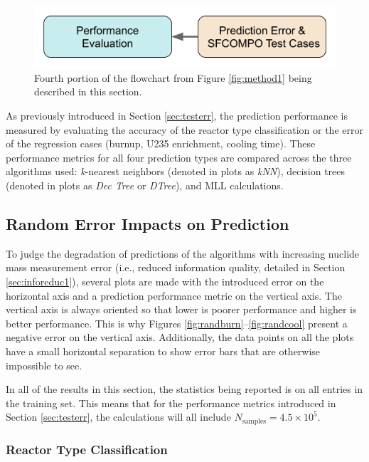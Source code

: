 
\begin{figure}[H]
  \centering
  \includegraphics[width=0.7\linewidth]{./chapters/exp1/methodology1_4.png}
  \caption[Fourth portion of the flowchart from Figure \ref{fig:method1}]
          {Fourth portion of the flowchart from Figure \ref{fig:method1} being 
           described in this section.}
\end{figure}

As previously introduced in Section \ref{sec:testerr}, the prediction
performance is measured by evaluating the accuracy of the reactor type
classification or the error of the regression cases (burnup, \gls{U235}
enrichment, cooling time).  These performance metrics for all four prediction
types are compared across the three algorithms used: \textit{k}-nearest
neighbors (denoted in plots as \textit{kNN}), decision trees (denoted in plots
as \textit{Dec Tree} or \textit{DTree}), and \gls{MLL} calculations.  

\subsection{Random Error Impacts on Prediction}
\label{sec:randerr}

To judge the degradation of predictions of the algorithms with increasing
nuclide mass measurement error (i.e., reduced information quality, detailed in
Section \ref{sec:inforeduc1}), several plots are made with the introduced error
on the horizontal axis and a prediction performance metric on the
vertical axis.  The vertical axis is always oriented so that lower is
poorer performance and higher is better performance. This is why Figures
\ref{fig:randburn}--\ref{fig:randcool} present a negative error on the
vertical axis. Additionally, the data points on all the plots have a small
horizontal separation to show error bars that are otherwise impossible to see.

In all of the results in this section, the statistics being reported is on all
entries in the training set. This means that for the performance metrics
introduced in Section \ref{sec:testerr}, the calculations will all include
$N_\text{samples} = 4.5 \times 10^5$.

\subsubsection{Reactor Type Classification}
\label{sec:randerrA}

